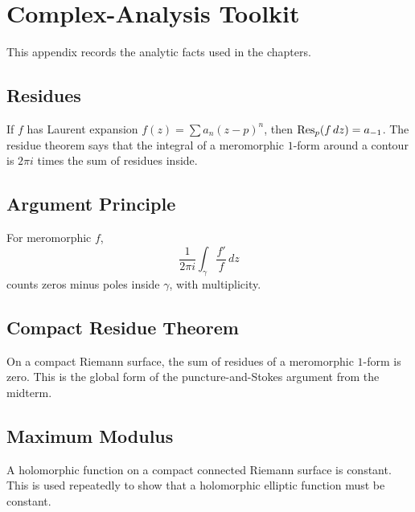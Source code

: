 \chapter{Complex-Analysis Toolkit}
\label{app:complex-toolkit}

This appendix records the analytic facts used in the chapters.

\section{Residues}

If \(f\) has Laurent expansion \(f(z)=\sum a_n(z-p)^n\), then
\(\operatorname{Res}_p(f\,dz)=a_{-1}\).  The residue theorem says that the integral of a
meromorphic \(1\)-form around a contour is \(2\pi i\) times the sum of residues
inside.

\section{Argument Principle}

For meromorphic \(f\),
\[
  \frac{1}{2\pi i}\int_\gamma \frac{f'}{f}\,dz
\]
counts zeros minus poles inside \(\gamma\), with multiplicity.

\section{Compact Residue Theorem}

On a compact Riemann surface, the sum of residues of a meromorphic \(1\)-form is
zero.  This is the global form of the puncture-and-Stokes argument from the
midterm.

\section{Maximum Modulus}

A holomorphic function on a compact connected Riemann surface is constant.  This
is used repeatedly to show that a holomorphic elliptic function must be constant.

